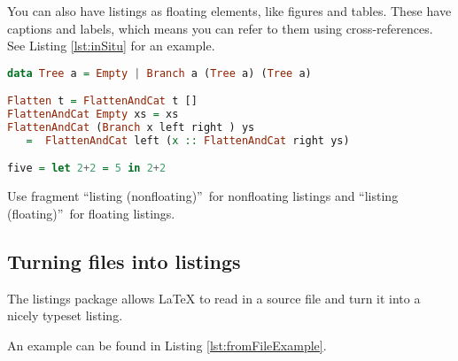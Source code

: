 You can also have listings as floating elements, like figures and tables.
These have captions and labels, which means you can refer to them using
cross-references. See Listing \ref{lst:inSitu} for an example.

\begin{singlespaced}%

%
%
%
\begin{lstlisting}[float=tb,language=Haskell,caption={This listing is {\it in situ}}, label=lst:inSitu]
data Tree a = Empty | Branch a (Tree a) (Tree a)

Flatten t = FlattenAndCat t []
FlattenAndCat Empty xs = xs
FlattenAndCat (Branch x left right ) ys
   =  FlattenAndCat left (x :: FlattenAndCat right ys)

five = let 2+2 = 5 in 2+2 

\end{lstlisting}%

\end{singlespaced}%

Use fragment \textquotedblleft listing (nonfloating)\textquotedblright\ for
nonfloating listings and \textquotedblleft listing
(floating)\textquotedblright\ for floating listings.

\subsection{Turning files into listings}

The listings package allows LaTeX to read in a source file and turn it into
a nicely typeset listing.

An example can be found in Listing \ref{lst:fromFileExample}.

